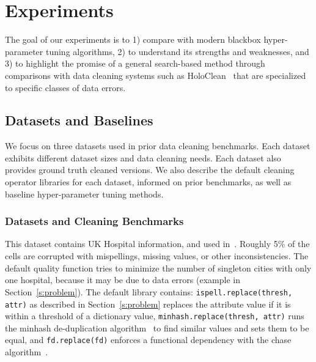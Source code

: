 \section{Experiments}\label{s:exp}
The goal of our experiments is to 1) compare \sys with modern blackbox hyper-parameter tuning algorithms, 2) to understand its strengths and weaknesses, and 3) to highlight the promise of a general search-based method through comparisons with data cleaning systems such as HoloClean~\cite{rekatsinas2017holoclean} that are specialized to specific classes of data errors. 




\subsection{Datasets and Baselines}
We focus on three datasets used in prior data cleaning benchmarks.  Each dataset exhibits different dataset sizes and data cleaning needs. Each dataset also provides ground truth cleaned versions. We also describe the default cleaning operator libraries for each dataset, informed on prior benchmarks, as well as baseline hyper-parameter tuning methods.

\subsubsection{Datasets and Cleaning Benchmarks}


 This dataset contains UK Hospital information, and used in~\cite{he2016interactive, rekatsinas2017holoclean}.  Roughly 5\% of the cells are corrupted with mispellings, missing values, or other inconsistencies.  The default quality function tries to minimize the number of singleton cities with only one hospital, because it may be due to data errors (example in Section~\ref{s:problem}).  The default library contains: \texttt{ispell.replace(thresh, attr)} as described in Section~\ref{s:problem} replaces the attribute value if it is within a threshold of a dictionary value, \texttt{minhash.replace(thresh, attr)} runs the minhash de-duplication algorithm~\cite{broder2000min} to find similar values and sets them to be equal, and \texttt{fd.replace(fd)} enforces a functional dependency with the chase algorithm~\cite{aho1979theory}.


